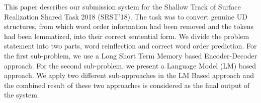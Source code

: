 This paper describes our submission system for the Shallow Track of Surface Realization Shared Task 2018 (SRST'18). The task was to convert genuine UD structures, from which word order information had been removed and the tokens had been lemmatized, into their correct sentential form. We divide the problem statement into two parts, word reinflection and correct word order prediction. For the first sub-problem, we use a Long Short Term Memory based Encoder-Decoder approach. For the second sub-problem, we present a Language Model (LM) based approach. We apply two different sub-approaches in the LM Based approach and the combined result of these two approaches is considered as the final output of the system.
